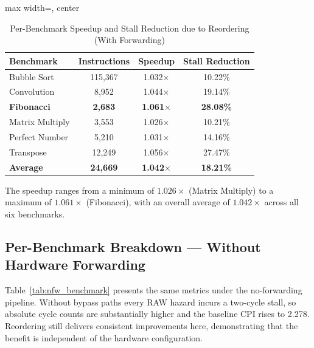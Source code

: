 \documentclass[11pt]{report}
\begin{document}
\begin{table}[H]
\centering
\caption{Per-Benchmark Speedup and Stall Reduction due to Reordering (With Forwarding)}
\label{tab:speedup}
\renewcommand{\arraystretch}{1.3}
\begin{adjustbox}{max width=\linewidth, center}
\footnotesize
\begin{tabular}{@{}lccc@{}}
\toprule
\textbf{Benchmark} & \textbf{Instructions} & \textbf{Speedup} & \textbf{Stall Reduction} \\
\midrule
Bubble Sort      & 115,367 & 1.032$\times$ & 10.22\% \\
Convolution      & 8,952   & 1.044$\times$ & 19.14\% \\
\textbf{Fibonacci} & \textbf{2,683} & \textbf{1.061$\times$} & \textbf{28.08\%} \\
Matrix Multiply  & 3,553   & 1.026$\times$ & 10.21\% \\
Perfect Number   & 5,210   & 1.031$\times$ & 14.16\% \\
Transpose        & 12,249  & 1.056$\times$ & 27.47\% \\
\midrule
\textbf{Average} & \textbf{24,669} & \textbf{1.042$\times$} & \textbf{18.21\%} \\
\bottomrule
\end{tabular}
\end{adjustbox}
\end{table}

The speedup ranges from a minimum of $1.026\times$ (Matrix Multiply) to a maximum of $1.061\times$ (Fibonacci), with an overall average of $\mathbf{1.042\times}$ across all six benchmarks.

\subsection{Per-Benchmark Breakdown --- Without Hardware Forwarding}

Table~\ref{tab:nfw_benchmark} presents the same metrics under the no-forwarding pipeline. Without bypass paths every RAW hazard incurs a two-cycle stall, so absolute cycle counts are substantially higher and the baseline CPI rises to 2.278. Reordering still delivers consistent improvements here, demonstrating that the benefit is independent of the hardware configuration.
\end{document}
